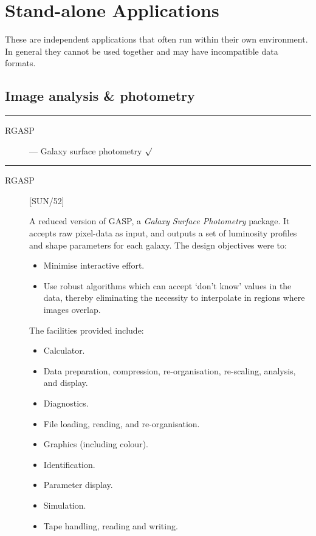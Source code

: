 \newpage

\section{Stand-alone Applications}

These are independent applications that often run within their own environment.
In general they cannot be used together and may have incompatible data formats.

\subsection{Image analysis \& photometry}

\rule{\textwidth}{0.5mm}
\begin{description}
\begin{description}
\item [RGASP] --- Galaxy surface photometry \hfill $\surd$
\end{description}
\end{description}
\rule{\textwidth}{0.5mm}

\begin{description}

\item [RGASP] \hfill [SUN/52]

A reduced version of GASP, a {\em Galaxy Surface Photometry} package.
It accepts raw pixel-data as input, and outputs a set of luminosity profiles and
shape parameters for each galaxy.
The design objectives were to:
\begin{itemize}
\item Minimise interactive effort.
\item Use robust algorithms which can accept `don't know' values in the data,
thereby eliminating the necessity to interpolate in regions where images
overlap.
\end{itemize}
The facilities provided include:
\begin{itemize}
\item Calculator.
\item Data preparation, compression, re-organisation, re-scaling, analysis, and
 display.
\item Diagnostics.
\item File loading, reading, and re-organisation.
\item Graphics (including colour).
\item Identification.
\item Parameter display.
\item Simulation.
\item Tape handling, reading and writing.
\end{itemize}
\end{description}

